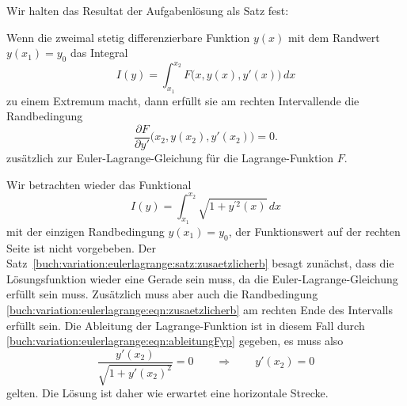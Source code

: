 Wir halten das Resultat der Aufgabenlösung als Satz fest:

\begin{satz}
\label{buch:variation:eulerlagrange:satz:zusaetzlicherb}
Wenn die zweimal stetig differenzierbare Funktion $y(x)$ mit dem
Randwert $y(x_1)=y_0$ das Integral
\[
I(y)
=
\int_{x_1}^{x_2} F\bigl(x,y(x),y'(x)\bigr)\,dx
\]
zu einem Extremum macht, dann erfüllt sie am rechten Intervallende
die Randbedingung
\begin{equation}
\frac{\partial F}{\partial y'}\bigl(x_2,y(x_2),y'(x_2)\bigr)=0.
\label{buch:variation:eulerlagrange:eqn:zusaetzlicherb}
\end{equation}
zusätzlich zur Euler-Lagrange-Gleichung für die Lagrange-Funktion $F$.
\end{satz}

\begin{beispiel}
\label{buch:variation:eulerlagrange:beispiel:einseitigegerade}
Wir betrachten wieder das Funktional
\[
I(y)
=
\int_{x_1}^{x_2}
\sqrt{1+y^{\prime 2}(x)}
\,dx
\]
mit der einzigen Randbedingung $y(x_1)=y_0$, der Funktionswert auf 
der rechten Seite ist nicht vorgebeben.
Der Satz~\eqref{buch:variation:eulerlagrange:satz:zusaetzlicherb}
besagt zunächst, dass die Lösungsfunktion wieder eine Gerade sein
muss, da die Euler-Lagrange-Gleichung erfüllt sein muss.
Zusätzlich muss aber auch die Randbedingung
\eqref{buch:variation:eulerlagrange:eqn:zusaetzlicherb}
am rechten Ende des Intervalls erfüllt sein.
Die Ableitung der Lagrange-Funktion ist in diesem Fall durch
\eqref{buch:variation:eulerlagrange:eqn:ableitungFyp}
gegeben, es muss also
\[
\frac{y'(x_2)}{\sqrt{1+y'(x_2)^2}}
=
0
\qquad\Rightarrow\qquad y'(x_2)=0
\]
gelten.
Die Lösung ist daher wie erwartet eine horizontale Strecke.
\end{beispiel}



